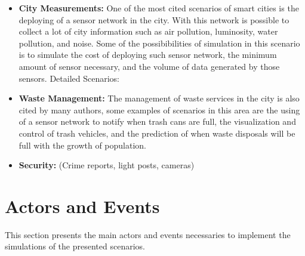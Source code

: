 \documentclass[
journal=jacsat, %
manuscript=article]{achemso}
\begin{document}
\begin{itemize}
\item \textbf{City Measurements:} One of the most cited scenarios of smart cities is the deploying of a sensor network in the city. With this network is possible to collect a lot of city information such as air pollution, luminosity, water pollution, and noise. Some of the possibibilities of simulation in this scenario is to simulate the cost of deploying such sensor network, the minimum amount of sensor necessary, and the volume of data generated by those sensors.
Detailed Scenarios:

\item \textbf{Waste Management:} The management of waste services in the city is also cited by many authors, some examples of scenarios in this area are the using of a sensor network to notify when trash cans are full, the visualization and control of trash vehicles, and the prediction of when waste disposals will be full with the growth of population.

\item \textbf{Security:} (Crime reports, light posts, cameras)

\end{itemize}


\section{Actors and Events}

This section presents the main actors and events necessaries to implement the simulations of the presented scenarios.
\end{document}
